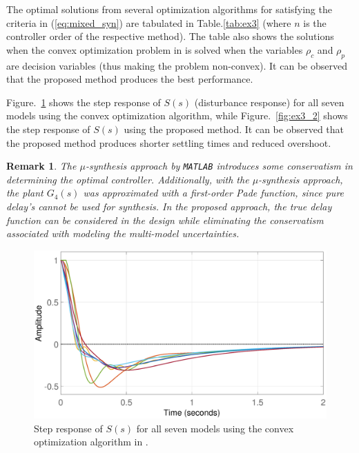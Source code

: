 \documentclass[letterpaper, 10 pt, conference]{ieeeconf}  %
\newtheorem*{remark*}{Remark}
\begin{document}
The optimal solutions from several optimization algorithms for satisfying the criteria in (\ref{eq:mixed_syn}) are tabulated in Table.\ref{tab:ex3} (where $n$ is the controller order of the respective method). The table also shows the solutions when the convex optimization problem in \cite{KNZ16} is solved when the variables $\rho_c$ and $\rho_p$ are decision variables (thus making the problem non-convex). It can be observed that the proposed method produces the best performance. 

Figure.~\ref{fig:ex3_1} shows the step response of $S(s)$ (disturbance response) for all seven models using the convex optimization algorithm, while Figure.~\ref{fig:ex3_2} shows the step response of $S(s)$ using the proposed method. It can be observed that the proposed method produces shorter settling times and reduced overshoot. 

\begin{remark*}
The $\mu$-synthesis approach by \texttt{MATLAB} introduces some conservatism in determining the optimal controller. Additionally, with the $\mu$-synthesis approach, the plant $G_4(s)$ was approximated with a first-order Pade function, since pure delay's cannot be used for synthesis. In the proposed approach, the true delay function can be considered in the design while eliminating the conservatism associated with modeling the multi-model uncertainties. 
\end{remark*}





\begin{figure}
\centering
\includegraphics[width=\columnwidth]{../pics/step_multi_convex.eps}
\caption{Step response of $S(s)$ for all seven models using the convex optimization algorithm in \cite{KNZ16}.}
\label{fig:ex3_1}
\end{figure}
\end{document}
